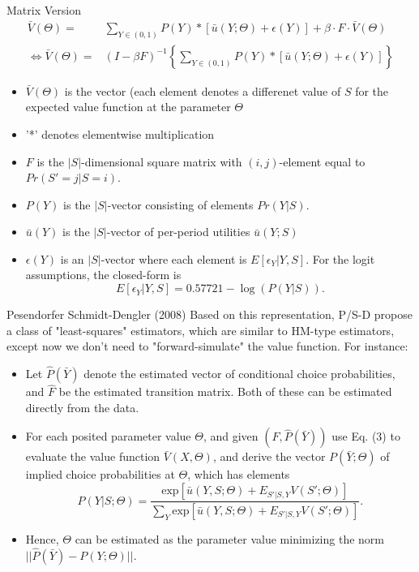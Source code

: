 \documentclass[aspectratio=169,11pt]{beamer}
\begin{document}
\begin{frame}{Matrix Version}
\begin{equation}
\begin{split}
\bar V (\Theta) = & \sum_{Y \in (0,1)} P(Y) * [\bar u (Y; \Theta) + \epsilon(Y)] + \beta \cdot F \cdot \bar V (\Theta) \\
\Leftrightarrow \bar V (\Theta) = & (I - \beta F)^{-1} \left \{ \sum_{Y \in (0,1)} P(Y) * [ \bar u (Y; \Theta) + \epsilon(Y) ] \right \}
\end{split}
\end{equation}
\begin{itemize}
\item  $\bar V(\Theta)$  is the vector (each element denotes a differenet value of $S$ for the expected value function at the parameter $\Theta$ \\
\item '*' denotes elementwise multiplication \\
\item $F$ is the $|S|$-dimensional square matrix with $(i,j)$-element equal to $Pr(S' = j | S = i)$. 
\item $P(Y)$ is the $|S|$-vector consisting of elements $Pr(Y|S)$. 
\item $\bar u (Y)$ is the $|S|$-vector of per-period utilities $\bar u (Y;S)$
\item $\epsilon(Y)$ is an $|S|$-vector where each element is $E[\epsilon_Y | Y,S]$. For the logit assumptions, the closed-form is 
\begin{equation}E[\epsilon_Y|Y,S] = 0.57721- \log(P(Y|S)).\end{equation}
\end{itemize}
\end{frame}

\begin{frame}{Pesendorfer Schmidt-Dengler (2008)}
Based on this representation, P/S-D propose a class of "least-squares" estimators, which are similar to HM-type estimators, except now we don't need to "forward-simulate" the value function. For instance:\\
\begin{itemize}
\item Let $\hat P (\bar Y)$ denote the estimated vector of conditional choice probabilities, and $\hat F$ be the estimated transition matrix. Both of these can be estimated directly from the data.
\item For each posited parameter value $\Theta$, and given $( \hat F, \hat P (\bar Y))$ use Eq. (3) to evaluate the value function $\bar V(X, \Theta)$, and derive the vector $P(\bar Y; \Theta)$ of implied choice probabilities at $\Theta$, which has elements
\begin{equation*}
P(Y|S;\Theta) = \frac {\text{exp} [ \bar u(Y,S; \Theta) + E_{S'|S,Y} V(S';\Theta)]}{\sum_Y \text{exp}[\bar u (Y,S;\Theta) + E_{S'|S,Y} V(S';\Theta)]}. 
\end{equation*}
\item Hence, $\Theta$ can be estimated as the parameter value minimizing the norm $|| \hat P(\bar Y) - P(Y;\Theta)||$.
\end{itemize}
\end{frame}
\end{document}
